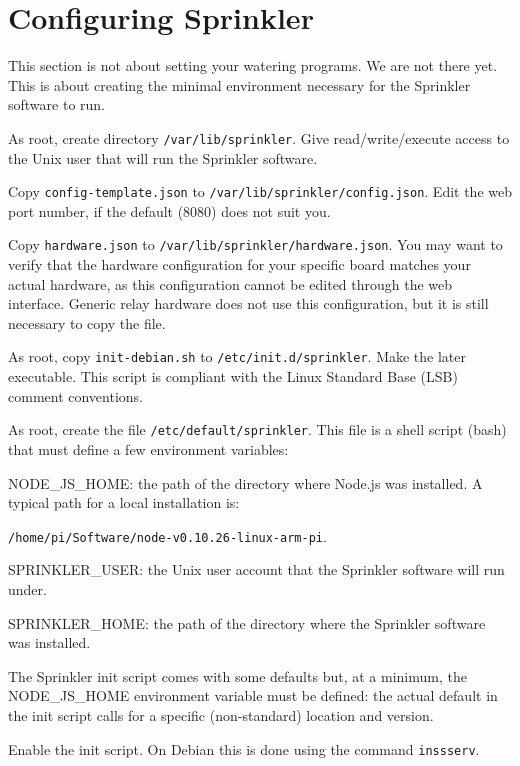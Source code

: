 \documentclass[11pt]{book}
\begin{document}
\section{Configuring Sprinkler}
This section is not about setting your watering programs. We are not there yet. This is about creating the minimal environment necessary for the Sprinkler software to run.
\begin{description}
\item As root, create directory \texttt{/var/lib/sprinkler}. Give read/write/execute access to the Unix user that will run the Sprinkler software.
\item Copy \texttt{config-template.json} to \texttt{/var/lib/sprinkler/config.json}. Edit the web port number, if the default (8080) does not suit you.
\item Copy \texttt{hardware.json} to \texttt{/var/lib/sprinkler/hardware.json}. You may want to verify that the hardware configuration for your specific board matches your actual hardware, as this configuration cannot be edited through the web interface. Generic relay hardware does not use this configuration, but it is still necessary to copy the file.
\item As root, copy \texttt{init-debian.sh} to \texttt{/etc/init.d/sprinkler}. Make the later executable. This script is compliant with the Linux Standard Base (LSB) comment conventions.
\item As root, create the file \texttt{/etc/default/sprinkler}. This file is a shell script (bash) that must define a few environment variables:
\begin{description}
\item NODE\_JS\_HOME: the path of the directory where Node.js was installed. A typical path for a local installation is:

\texttt{/home/pi/Software/node-v0.10.26-linux-arm-pi}.
\item SPRINKLER\_USER: the Unix user account that the Sprinkler software will run under.
\item SPRINKLER\_HOME: the path of the directory where the Sprinkler software was installed.
\end{description}
The Sprinkler init script comes with some defaults but, at a minimum, the NODE\_JS\_HOME environment variable must be defined: the actual default in the init script calls for a specific (non-standard) location and version.
\item Enable the init script. On Debian this is done using the command \texttt{inssserv}.
\end{description}
\end{document}
